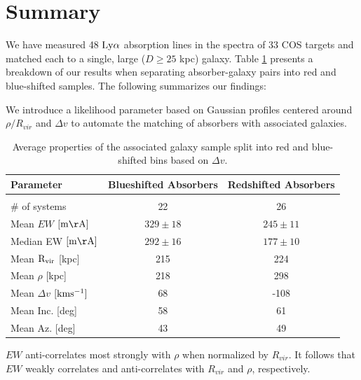 \documentclass[iop]{emulateapj-rtx4}
\begin{document}
\section{Summary}


We have measured 48 $\rm Ly\alpha$ absorption lines in the spectra of 33 COS targets and matched each to a single, large ($D\geq 25$ kpc) galaxy. Table \ref{resultsTable} presents a breakdown of our results when separating absorber-galaxy pairs into red and blue-shifted samples. The following summarizes our findings:

\indent \textbullet \indent We introduce a likelihood parameter based on Gaussian profiles centered around $\rho / R_{vir}$ and $\Delta v$ to automate the matching of absorbers with associated galaxies. 

\begin{table}[ht]\footnotesize
\begin{center}
\begin{tabular}{l c c}
 \hline \hline
 Parameter                				&  Blueshifted Absorbers   &     Redshifted Absorbers     \\ 
  \hline \hline \\
  
 \# of systems          			 		&     	22				&	26			\\
 Mean $EW$    \scriptsize $\rm [m\AA]$    &	$329 \pm 18$ 		&	$245 \pm 11$  	\\
 Median EW     \scriptsize $\rm [m\AA]$    & 	$292 \pm 16$		& 	$177 \pm 10$	\\
 Mean $\rm R_{vir}$   \scriptsize [kpc]	&   	215				& 	224			\\
 Mean $\rho$   \scriptsize [kpc]          		&   	218				& 	298			\\
 Mean $\Delta v$  \scriptsize $\rm [km s^{-1}]$     &	68			&	-108 			\\
 Mean Inc.  \scriptsize [deg]  			&  	58				&	61			\\
 Mean Az.  \scriptsize [deg]    			&	43				&	49			\\
   
\hline
\end{tabular}
\end{center}
  \caption{\small{Average properties of the associated galaxy sample split into red and blue-shifted bins based on $\Delta v$.}}
  \label{resultsTable}
\end{table}

\indent \textbullet \indent $EW$ anti-correlates most strongly with $\rho$ when normalized by $R_{vir}$. It follows that $EW$ weakly correlates and anti-correlates with $R_{vir}$ and $\rho$, respectively.
\end{document}
